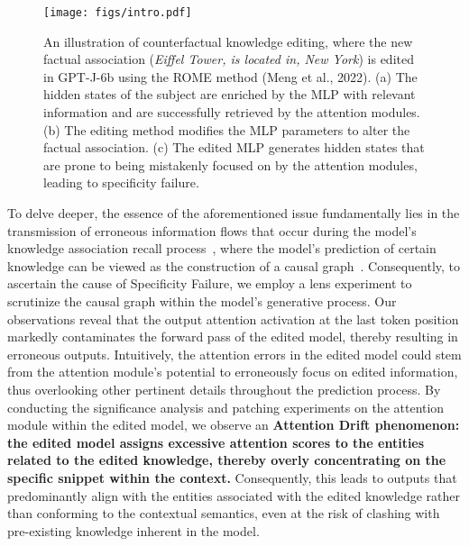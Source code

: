 \begin{figure}[t]
  \centering
  \vspace{-19pt}
  \texttt{[image: figs/intro.pdf]}
  \caption{An illustration of counterfactual knowledge editing, where the new factual association (\textit{Eiffel Tower, is located in, New York}) is edited in GPT-J-6b using the ROME method (Meng et al., 2022). (a) The hidden states of the subject are enriched by the MLP with relevant information and are successfully retrieved by the attention modules. (b) The editing method modifies the MLP parameters to alter the factual association. (c) The edited MLP generates hidden states that are prone to being mistakenly focused on by the attention modules, leading to specificity failure.}
  \label{fig:intro}
  \vspace{-11pt}
\end{figure}

To delve deeper, the essence of the aforementioned issue fundamentally lies in the transmission of erroneous information flows that occur during the model's knowledge association recall process~\citep{geva2023dissecting}, where the model's prediction of certain knowledge can be viewed as the construction of a causal graph~\citep{rome}.
Consequently, to ascertain the cause of Specificity Failure, we employ a lens experiment to scrutinize the causal graph within the model's generative process. Our observations reveal that the output attention activation at the last token position markedly contaminates the forward pass of the edited model, thereby resulting in erroneous outputs. Intuitively, the attention errors in the edited model could stem from the attention module's potential to erroneously focus on edited information, thus overlooking other pertinent details throughout the prediction process. By conducting the significance analysis and patching experiments on the attention module within the edited model, we observe an \textbf{Attention Drift phenomenon: the edited model assigns excessive attention scores to the entities related to the edited knowledge, thereby overly concentrating on the specific snippet within the context.} Consequently, this leads to outputs that predominantly align with the entities associated with the edited knowledge rather than conforming to the contextual semantics, even at the risk of clashing with pre-existing knowledge inherent in the model.

